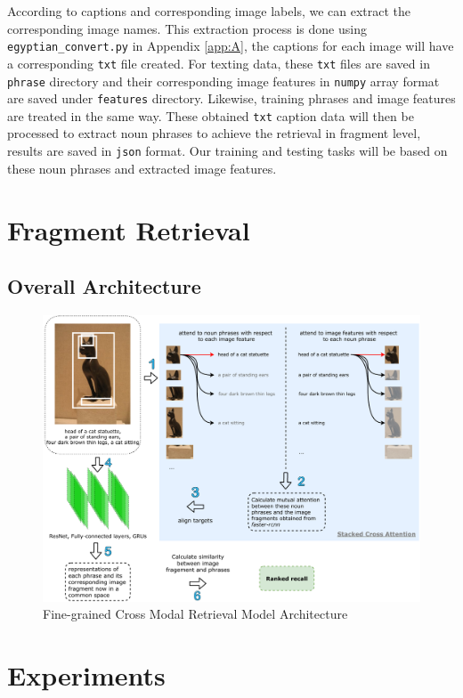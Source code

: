 According to captions and corresponding image labels, we can extract the corresponding image names. This extraction process is done using \verb|egyptian_convert.py| in Appendix \ref{app:A}, the captions for each image will have a corresponding \verb|txt| file created. For texting data, these \verb|txt| files are saved in \verb|phrase| directory and their corresponding image features in \verb|numpy| array format are saved under \verb|features| directory. Likewise, training phrases and image features are treated in the same way. These obtained \verb|txt| caption data will then be processed to extract noun phrases to achieve the retrieval in fragment level, results are saved in \verb|json| format. Our training and testing tasks will be based on these noun phrases and extracted image features.

\section{Fragment Retrieval}

\subsection{Overall Architecture}

\begin{figure}[h!]
\centering
\includegraphics[width=\textwidth]{archi.pdf}
\caption{Fine-grained Cross Modal Retrieval Model Architecture}
\label{fig:mainarch}
\end{figure}


\section{Experiments}

